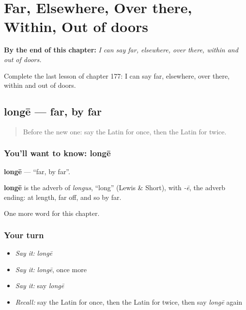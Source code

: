 
\chapter{Far, Elsewhere, Over there, Within, Out of doors}
\label{ch:la-far-elsewhere-over-there-within-out-of-doors}

\begin{chapteropening}
\textbf{By the end of this chapter:} \emph{I can say far, elsewhere, over there, within and out of doors.}

Complete the last lesson of chapter 177: I can say far, elsewhere, over there, within and out of doors.
\end{chapteropening}

\section[longē]{longē — far, by far}

\label{lesson:LA-C177-longe}



\begin{quote}
Before the new one: say the Latin for once, then the Latin for twice.
\end{quote}

\subsection*{You'll want to know: longē}
\textbf{longē} — \textquotedblleft{}far, by far\textquotedblright{}.

\begin{cousinweb}
\textbf{longē} is the adverb of \emph{longus}, \textquotedblleft{}long\textquotedblright{} (Lewis \& Short), with \emph{-ē}, the adverb ending: at length, far off, and so by far.
\end{cousinweb}

\begin{grammarlens}[title={What you've built}]
One more word for this chapter.
\end{grammarlens}

\subsection*{Your turn}
\begin{itemize}
\raggedright
  \item \emph{Say it:} \emph{longē}
  \item \emph{Say it:} \emph{longē}, once more
  \item \emph{Say it:} say \emph{longē}
  \item \emph{Recall:} say the Latin for once, then the Latin for twice, then say \emph{longē} again
\end{itemize}

